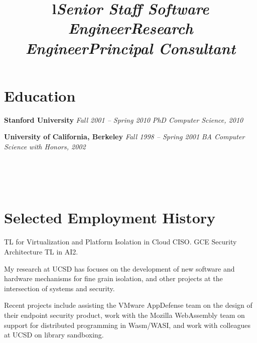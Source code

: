\begin{resume}

\section{\sc Education}

{\bf Stanford University}
{\it Fall 2001 -- Spring 2010} \newline
{\it PhD Computer Science, 2010}

{\bf University of California, Berkeley }
{\it Fall 1998 -- Spring 2001 } \newline
{\it BA Computer Science with Honors, 2002}


\begin{format}
\title{l}  \\  \\
\body\\
\end{format}


\section{\sc Selected Employment History}

\title{\em Senior Staff Software Engineer}
\begin{position} TL for Virtualization and Platform Isolation in Cloud CISO. GCE Security Architecture TL in AI2.
\end{position}


\title{\em Research Engineer}
\begin{position}
My research at UCSD has focuses on the development of new software and hardware
mechanisms for fine grain isolation, and other projects at the intersection of
systems and security.  \end{position}


\title{\em Principal Consultant}
\begin{position}
Recent projects include assisting the VMware AppDefense team on the design of
their endpoint security product, work with the Mozilla
WebAssembly team on support for distributed programming in Wasm/WASI, and work with
colleagues at UCSD on library sandboxing.
\end{position}



\end{resume}
